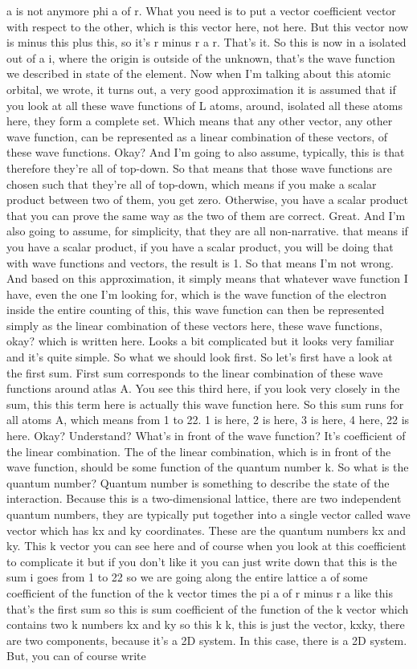 a is not anymore phi a of r. What you need is to put a vector coefficient vector with respect to the other, which is this vector here, not here. But this vector now is minus this plus this, so it's r minus r a r. That's it. So this is now in a isolated out of a i, where the origin is outside of the unknown, that's the wave function we described in state of the element. Now when I'm talking about this atomic orbital, we wrote, it turns out, a very good approximation it is assumed that if you look at all these wave functions of L atoms, around, isolated all these atoms here, they form a complete set. Which means that any other vector, any other wave function, can be represented as a linear combination of these vectors, of these wave functions. Okay? And I'm going to also assume, typically, this is that therefore they're all of top-down. So that means that those wave functions are chosen such that they're all of top-down, which means if you make a scalar product between two of them, you get zero. Otherwise, you have a scalar product that you can prove the same way as the two of them are correct. Great. And I'm also going to assume, for simplicity, that they are all non-narrative. that means if you have a scalar product, if you have a scalar product, you will be doing that with wave functions and vectors, the result is 1. So that means I'm not wrong. And based on this approximation, it simply means that whatever wave function I have, even the one I'm looking for, which is the wave function of the electron inside the entire counting of this, this wave function can then be represented simply as the linear combination of these vectors here, these wave functions, okay? which is written here. Looks a bit complicated but it looks very familiar and it's quite simple. So what we should look first. So let's first have a look at the first sum. First sum corresponds to the linear combination of these wave functions around atlas A. You see this third here, if you look very closely in the sum, this this term here is actually this wave function here. So this sum runs for all atoms A, which means from 1 to 22. 1 is here, 2 is here, 3 is here, 4 here, 22 is here. Okay? Understand? What's in front of the wave function? It's coefficient of the linear combination. The of the linear combination, which is in front of the wave function, should be some function of the quantum number k. So what is the quantum number? Quantum number is something to describe the state of the interaction. Because this is a two-dimensional lattice, there are two independent quantum numbers, they are typically put together into a single vector called wave vector which has kx and ky coordinates. These are the quantum numbers kx and ky. This k vector you can see here and of course when you look at this coefficient to complicate it but if you don't like it you can just write down that this is the sum i goes from 1 to 22 so we are going along the entire lattice a of some coefficient of the function of the k vector times the pi a of r minus r a like this that's the first sum so this is sum coefficient of the function of the k vector which contains two k numbers kx and ky so this k k, this is just the vector, kxky, there are two components, because it's a 2D system. In this case, there is a 2D system. But, you can of course write 